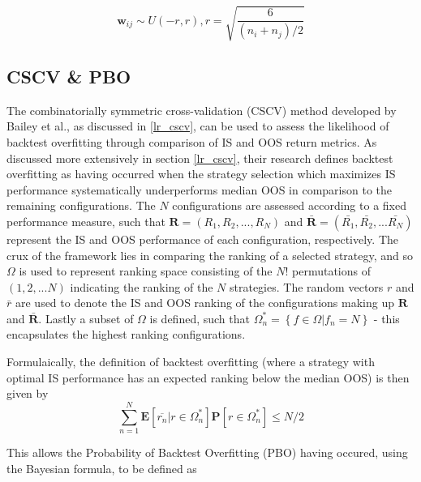 \documentclass[a4paper,11pt,oneside]{article}
\theoremstyle{plain}
\theoremstyle{definition}
\begin{document}
\begin{equation}
\mathbf{w}_{ij} \sim U(-r, r), r = \sqrt{\frac{6}{(n_i + n_j)/2}}
\end{equation}













\subsection{CSCV \& PBO}\label{imp_cscv}

The  combinatorially symmetric cross-validation (CSCV) method developed by Bailey et al., as discussed in \ref{lr_cscv}, can be used to assess the likelihood of backtest overfitting through comparison of IS and OOS return metrics. As discussed more extensively in section \ref{lr_cscv}, their research defines backtest overfitting as having
occurred when the strategy selection which maximizes IS performance systematically underperforms median OOS in comparison to the remaining configurations. The $N$  configurations are assessed according to a fixed performance measure, such that $\mathbf{R} = (R_1, R_2, ..., R_N)$ and $\mathbf{\bar{R}} = (\bar{R_1}, \bar{R_2},... \bar{R_N})$ represent the IS and OOS performance of each configuration, respectively. The crux of the framework lies in comparing the ranking of a selected strategy, and so $\Omega$ is used to represent ranking space consisting of the $N!$ permutations of $(1,2,...N)$ indicating the ranking of the $N$ strategies. The random vectors $r$ and $\bar{r}$ are used to denote the IS and OOS ranking of the configurations making up $\mathbf{R}$ and $\mathbf{\bar{R}}$. Lastly a subset of $\Omega$ is defined, such that $\Omega_{n}^{*}=\left\{f \in \Omega | f_{n}=N\right\}$ - this encapsulates the highest ranking configurations. \newline


Formulaically, the definition of backtest overfitting (where a strategy with optimal IS performance has an expected ranking below the median OOS) is then given by
\begin{equation}\label{eq:PBO1}
\sum_{n=1}^{N}\mathbf{E}[\overline{r_n}|r\in 
\Omega_{n}^{*}]\mathbf{P}[r\in\Omega_{n}^{*}]\leq{N/2}
\end{equation}

This allows the Probability of Backtest Overfitting (PBO) having occured, using the Bayesian formula, to be defined as 
\end{document}
